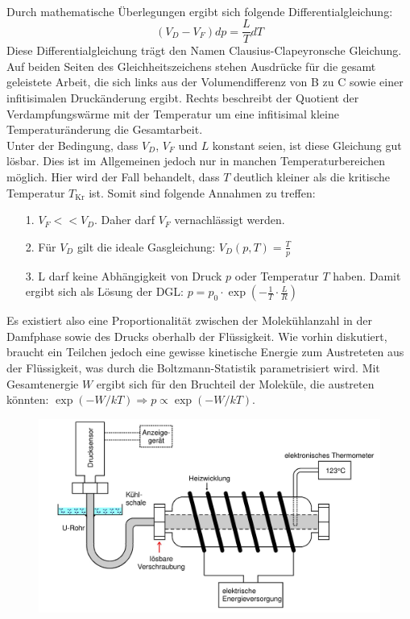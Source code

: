 \\
Durch mathematische Überlegungen ergibt sich folgende Differentialgleichung:
\begin{equation}
    (V_D-V_F)dp=\frac{L}{T}dT
\end{equation}
Diese Differentialgleichung trägt den Namen Clausius-Clapeyronsche Gleichung.
Auf beiden Seiten des Gleichheitszeichens stehen Ausdrücke für die gesamt
geleistete Arbeit, die sich links aus der Volumendifferenz von B zu C sowie einer infitisimalen
Druckänderung ergibt.
Rechts beschreibt der Quotient der Verdampfungswärme mit der Temperatur um eine infitisimal kleine
Temperaturänderung die Gesamtarbeit.\\
Unter der Bedingung, dass $V_D$, $V_F$ und $L$ konstant seien, ist diese Gleichung gut lösbar. Dies ist im
Allgemeinen jedoch nur in manchen Temperaturbereichen möglich. Hier wird der Fall behandelt, dass $T$ deutlich kleiner
als die kritische Temperatur $T_\text{Kr}$ ist.
\newpage
Somit sind folgende Annahmen zu treffen:
\begin{itemize}
    \item[1.] $V_F<<V_D$. Daher darf $V_F$ vernachlässigt werden.
    \item[2.] Für $V_D$ gilt die ideale Gasgleichung: $V_D(p,T)=\frac{T}{p}$
    \item[3.] L darf keine Abhängigkeit von Druck $p$ oder Temperatur $T$ haben. Damit
    ergibt sich als Lösung der DGL: $p=p_0\cdot \exp(-\frac{1}{T}\cdot\frac{L}{R})$
\end{itemize}
Es existiert also eine Proportionalität zwischen der Molekühlanzahl in der Damfphase sowie
des Drucks oberhalb der Flüssigkeit. Wie vorhin diskutiert, braucht ein Teilchen jedoch eine gewisse
kinetische Energie zum Austreteten aus der Flüssigkeit, was durch die Boltzmann-Statistik parametrisiert wird.
Mit Gesamtenergie $W$ ergibt sich für den Bruchteil der Moleküle, die austreten könnten:
$\exp(-W/kT)\Rightarrow p\propto \exp(-W/kT)$.
\begin{figure}
    \centering
    \includegraphics[scale=0.6]{screen3.jpg}
\end{figure}
